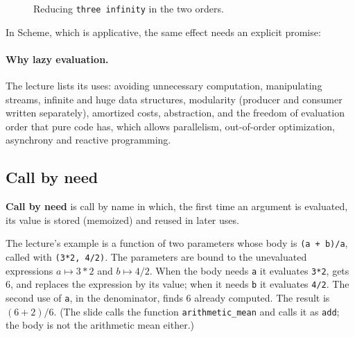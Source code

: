 \begin{figure}[h]
\centering
{}
\caption{Reducing \texttt{three infinity} in the two orders.}
\label{fig:three}
\end{figure}

In Scheme, which is applicative, the same effect needs an explicit promise:

\paragraph{Why lazy evaluation.} The lecture lists its uses: avoiding
unnecessary computation, manipulating streams, infinite and huge data
structures, modularity (producer and consumer written separately), amortized
costs, abstraction, and the freedom of evaluation order that pure code has,
which allows parallelism, out-of-order optimization, asynchrony and reactive
programming.

\subsection{Call by need}

\begin{definition}
\textbf{Call by need} is call by name in which, the first time an argument is
evaluated, its value is stored (memoized) and reused in later uses.
\end{definition}

The lecture's example is a function of two parameters whose body is
\texttt{(a + b)/a}, called with \texttt{(3*2, 4/2)}. The parameters are bound
to the unevaluated expressions $a \mapsto 3*2$ and $b \mapsto 4/2$. When the body
needs \texttt{a} it evaluates \texttt{3*2}, gets 6, and replaces the
expression by its value; when it needs \texttt{b} it evaluates \texttt{4/2}.
The second use of \texttt{a}, in the denominator, finds 6 already computed.
The result is $(6 + 2)/6$. (The slide calls the function
\texttt{arithmetic\_mean} and calls it as \texttt{add}; the body is not the
arithmetic mean either.)

